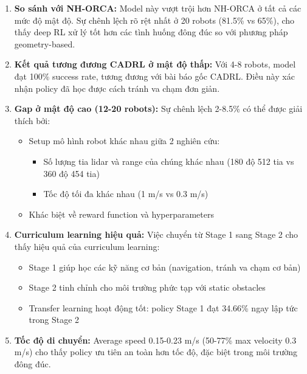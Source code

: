 \begin{enumerate}[nosep]
\item \textbf{So sánh với NH-ORCA:} Model này vượt trội hơn NH-ORCA ở tất cả các mức độ mật độ. Sự chênh lệch rõ rệt nhất ở 20 robots (81.5\% vs 65\%), cho thấy deep RL xử lý tốt hơn các tình huống đông đúc so với phương pháp geometry-based.

\item \textbf{Kết quả tương đương CADRL ở mật độ thấp:} Với 4-8 robots, model đạt 100\% success rate, tương đương với bài báo gốc CADRL. Điều này xác nhận policy đã học được cách tránh va chạm đơn giản.

\item \textbf{Gap ở mật độ cao (12-20 robots):} Sự chênh lệch 2-8.5\% có thể được giải thích bởi:
\begin{itemize}[nosep]
\item Setup mô hình robot khác nhau giữa 2 nghiên cứu:
    \begin{itemize}
        \item Số lượng tia lidar và range của chúng khác nhau (180 độ 512 tia vs 360 độ 454 tia)
        \item Tốc độ tối đa khác nhau (1 m/s vs 0.3 m/s)
    \end{itemize}
\item Khác biệt về reward function và hyperparameters
\end{itemize}

\item \textbf{Curriculum learning hiệu quả:} Việc chuyển từ Stage 1 sang Stage 2 cho thấy hiệu quả của curriculum learning:
\begin{itemize}[nosep]
\item Stage 1 giúp học các kỹ năng cơ bản (navigation, tránh va chạm cơ bản)
\item Stage 2 tinh chỉnh cho môi trường phức tạp với static obstacles
\item Transfer learning hoạt động tốt: policy Stage 1 đạt 34.66\% ngay lập tức trong Stage 2
\end{itemize}

\item \textbf{Tốc độ di chuyển:} Average speed 0.15-0.23 m/s (50-77\% max velocity 0.3 m/s) cho thấy policy ưu tiên an toàn hơn tốc độ, đặc biệt trong môi trường đông đúc.
\end{enumerate}

